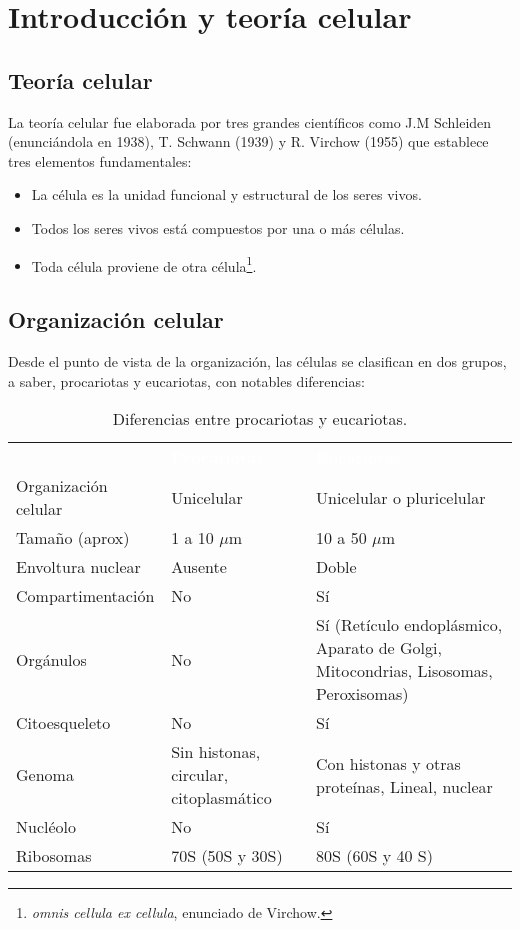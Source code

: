 \chapter{Introducción y teoría celular}
\section{Teoría celular}
La teoría celular fue elaborada por tres grandes científicos como J.M Schleiden (enunciándola en 1938), T. Schwann (1939) y R. Virchow (1955) que establece tres elementos fundamentales:
\begin{itemize}[itemsep=0pt,parsep=0pt,topsep=0pt,partopsep=0pt]
    \item La célula es la unidad funcional y estructural de los seres vivos.
    \item Todos los seres vivos está compuestos por una o más células.
    \item Toda célula proviene de otra célula\footnote{\textit{omnis cellula ex cellula}, enunciado de Virchow.}.
\end{itemize}
\section{Organización celular}
Desde el punto de vista de la organización, las células se clasifican en dos grupos, a saber, procariotas y eucariotas, con notables diferencias:
\begin{table}[H]
    \begin{tabular}{N{3.25cm}M{6cm} M{6.9cm}}
        \textcolor{white}{\textbf{}}&\textcolor{white}{\textbf{Procariotas}}&\textcolor{white}{\textbf{Eucariotas}}\\
        Organización celular&Unicelular&Unicelular o pluricelular\\
        Tamaño (aprox)&1 a 10 $\mu$m&10 a 50 $\mu$m\\
        Envoltura nuclear&Ausente&Doble\\
        Compartimentación&No&Sí\\
        Orgánulos&No&Sí (Retículo endoplásmico, Aparato de Golgi, Mitocondrias, Lisosomas, Peroxisomas)\\
        Citoesqueleto&No&Sí\\
        Genoma&Sin histonas, circular, citoplasmático&Con histonas y otras proteínas, Lineal, nuclear\\
        Nucléolo&No&Sí\\
        Ribosomas&70S (50S y 30S)&80S (60S y 40 S)\\
        \hline
    \end{tabular}
    \caption[Diferencias entre procariotas y eucariotas]{Diferencias entre procariotas y eucariotas.}
\end{table}
